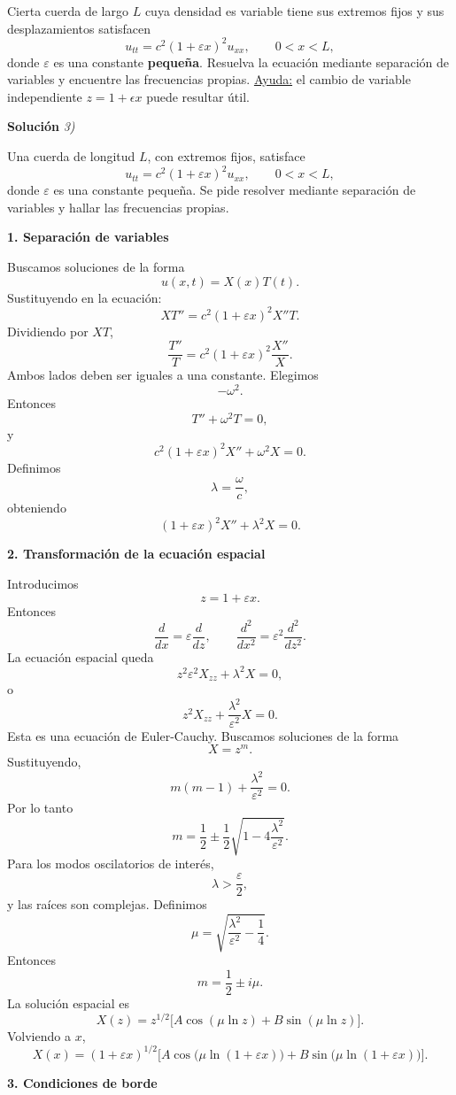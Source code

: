 \documentclass[11pt,spanish]{article}
\newcounter{problema}
\newcommand{\prob}{\stepcounter{problema} \vspace{.5cm} \noindent{\bf Problema \arabic{problema}: }}
\begin{document}
\prob Cierta cuerda de largo $L$ cuya densidad es variable tiene sus extremos fijos y sus desplazamientos satisfacen
\[
u_{tt} = c^2(1+\varepsilon x)^2 u_{xx}, \qquad 0<x<L,
\]
donde $\varepsilon$ es una constante {\bf pequeña}. Resuelva la ecuación mediante separación de variables y encuentre las frecuencias propias. \underline{Ayuda:} el cambio de variable independiente $z=1+\epsilon x$ puede resultar útil.

\vspace{0.5cm}
{\bf Soluci\'on }{\em 3)}
\vspace{0.5cm}

Una cuerda de longitud $L$, con extremos fijos, satisface
$$
u_{tt}=c^2(1+\varepsilon x)^2u_{xx},
\qquad 0<x<L,
$$
donde $\varepsilon$ es una constante pequeña.
Se pide resolver mediante separación de variables y hallar las frecuencias propias.

{\bf 1. Separación de variables}

Buscamos soluciones de la forma
$$
u(x,t)=X(x)T(t).
$$
Sustituyendo en la ecuación:
$$
X T''
=
c^2(1+\varepsilon x)^2 X'' T.
$$
Dividiendo por $XT$,
$$
\frac{T''}{T}
=
c^2(1+\varepsilon x)^2\frac{X''}{X}.
$$
Ambos lados deben ser iguales a una constante. Elegimos
$$
-\omega^2.
$$
Entonces
$$
T''+\omega^2T=0,
$$
y
$$
c^2(1+\varepsilon x)^2X''+\omega^2X=0.
$$
Definimos
$$
\lambda=\frac{\omega}{c},
$$
obteniendo
$$
(1+\varepsilon x)^2X''+\lambda^2X=0.
$$

{\bf 2. Transformación de la ecuación espacial}

Introducimos
$$
z=1+\varepsilon x.
$$
Entonces
$$
\frac{d}{dx}
=
\varepsilon\frac{d}{dz},
\qquad
\frac{d^2}{dx^2}
=
\varepsilon^2\frac{d^2}{dz^2}.
$$
La ecuación espacial queda
$$
z^2\varepsilon^2X_{zz}+\lambda^2X=0,
$$
o
$$
z^2X_{zz}
+\frac{\lambda^2}{\varepsilon^2}X=0.
$$
Esta es una ecuación de Euler-Cauchy.
Buscamos soluciones de la forma
$$
X=z^m.
$$
Sustituyendo,
$$
m(m-1)+\frac{\lambda^2}{\varepsilon^2}=0.
$$
Por lo tanto
$$
m=
\frac12
\pm
\frac12
\sqrt{1-4\frac{\lambda^2}{\varepsilon^2}}.
$$
Para los modos oscilatorios de interés,
$$
\lambda>\frac{\varepsilon}{2},
$$
y las raíces son complejas.
Definimos
$$
\mu=
\sqrt{\frac{\lambda^2}{\varepsilon^2}-\frac14}.
$$
Entonces
$$
m=\frac12\pm i\mu.
$$
La solución espacial es
$$
X(z)
=
z^{1/2}
\Big[
A\cos(\mu\ln z)
+
B\sin(\mu\ln z)
\Big].
$$
Volviendo a $x$,
$$
X(x)
=
(1+\varepsilon x)^{1/2}
\Big[
A\cos\big(\mu\ln(1+\varepsilon x)\big)
+
B\sin\big(\mu\ln(1+\varepsilon x)\big)
\Big].
$$

{\bf 3. Condiciones de borde}
\end{document}
